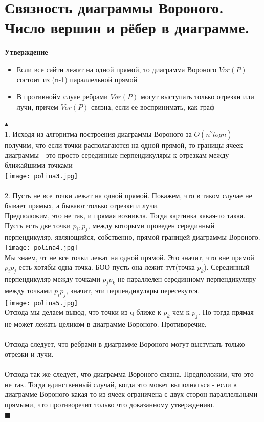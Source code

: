 \section{Связность диаграммы Вороного. Число вершин и рёбер в диаграмме.}
\textbf{Утверждение}
\begin{itemize}
    \item Если все сайти лежат на одной прямой, то диаграмма Вороного $Vor(P)$ состоит из (n-1) параллельной прямой
     \item В противнойм слуае ребрами $Vor(P)$ могут выступать только отрезки или лучи, причем $Vor(P)$ связна, если ее воспринимать, как граф
\end{itemize}
$\blacktriangle$ \\ 
1. Исходя из алгоритма построения диаграммы Вороного за $O(n^2 logn)$ получим, что если точки располагаются на одной прямой, то границы ячеек диаграммы - это просто серединные перпендикуляры к отрезкам между ближайшими точками\\
\texttt{[image: polina3.jpg]}
\\
\\
2. Пусть не все точки лежат на одной прямой. Покажем, что в таком случае не бывает прямых, а бывают только отрезки и лучи.
\\
Предположим, это не так, и прямая возникла. Тогда картинка какая-то такая. Пусть есть две точки $p_i, p_j$, между которыми проведен серединный перпендикуляр, являющийся, собственно, прямой-границей диаграммы Вороного. 
\\
\texttt{[image: polina4.jpg]}
\\
Мы знаем, чт не все точки лежат на одной прямой. Это значит, что вне прямой $p_ip_j$ есть хотябы одна точка. БОО пусть она лежит тут(точка $p_k$). Серединный перпендикуляр между точками  $p_jp_k$ не параллелен серединному перпендикуляру между точками $p_ip_j$, значит, эти перпендикуляры пересекутся.
\\
\texttt{[image: polina5.jpg]}
\\
Отсюда мы делаем вывод, что точки из q ближе к $p_k$ чем к $p_j$. Но тогда прямая не может лежать целиком в диаграмме Вороного. Противоречие.
\\
\\
Отсюда следует, что ребрами в диаграмме Вороного могут выступать только отрезки и лучи.
\\
\\
Отсюда так же следует, что диаграмма Вороного связна. Предположим, что это не так. Тогда единственный случай, когда это может выполняться - если в диаграмме Вороного какая-то из ячеек ограничена с двух сторон параллельными прямыми, что противоречит только что доказанному утверждению.\\$\blacksquare$

